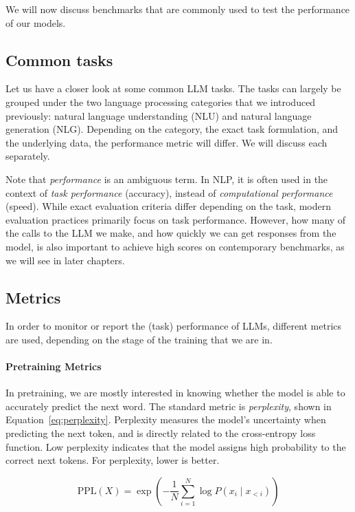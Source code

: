 We will now discuss  benchmarks that are commonly used to test the performance of our models.

\subsection{Common tasks}
Let us have a closer look at some common LLM tasks. The tasks can largely be grouped  under the two language processing  categories that we introduced  previously: natural language understanding (NLU)  and natural language generation (NLG). 
Depending on the category, the exact task formulation, and the underlying data,  the  performance metric will differ. We will discuss each separately.

Note  that {\em performance} is an ambiguous term. In NLP, it is often used in the context of \emph{task performance} (accuracy), instead of \emph{computational performance} (speed). While exact  evaluation criteria differ depending on the task, modern evaluation practices primarily focus on task performance. However, how many of the calls to the LLM we make, and how quickly we can get responses from the model, is also important to achieve high scores on contemporary benchmarks, as we will see in later chapters. 


\subsection{Metrics}\label{sec:metrics}
In order to monitor or report the (task) performance of LLMs,   different metrics are used, depending on the stage of the training that we are in. 

\paragraph{Pretraining Metrics}
In pretraining, we are mostly interested in knowing whether the model  is able to accurately predict the next word. The standard metric is {\em perplexity}, shown in Equation~\ref{eq:perplexity}. Perplexity measures the model's uncertainty when predicting the next token, and is directly related to the cross-entropy loss function. Low perplexity indicates that the model  assigns high probability to the correct next tokens. For perplexity, lower is better. 

\begin{equation}
    \text{PPL}(X) = \exp \left( - \frac{1}{N} \sum_{i=1}^N \log P(x_i \mid x_{<i}) \right)
    \label{eq:perplexity}
\end{equation}

